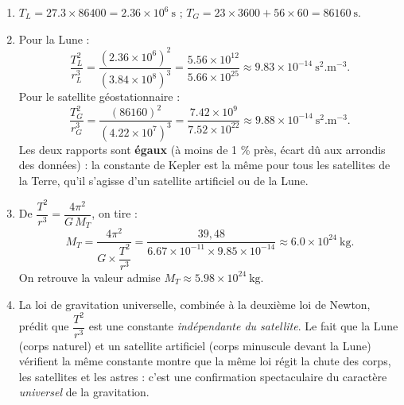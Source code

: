 \documentclass[11pt]{article}
\begin{document}
\begin{corrige}
\begin{enumerate}
\item $T_L = \num{27,3} \times \num{86400} = \num{2,36}\times 10^{6}\ \mathrm{s}$ ; \quad $T_G = 23\times 3600 + 56\times 60 = \num{86160}\ \mathrm{s}$.
\item Pour la Lune :
\[ \dfrac{T_L^2}{r_L^3} = \dfrac{(\num{2,36}\times 10^{6})^2}{(\num{3,84}\times 10^{8})^3} = \dfrac{\num{5,56}\times 10^{12}}{\num{5,66}\times 10^{25}} \approx \num{9,83}\times 10^{-14}\ \mathrm{s^2.m^{-3}}. \]
Pour le satellite géostationnaire :
\[ \dfrac{T_G^2}{r_G^3} = \dfrac{(\num{86160})^2}{(\num{4,22}\times 10^{7})^3} = \dfrac{\num{7,42}\times 10^{9}}{\num{7,52}\times 10^{22}} \approx \num{9,88}\times 10^{-14}\ \mathrm{s^2.m^{-3}}. \]
Les deux rapports sont \textbf{égaux} (à moins de 1 \% près, écart dû aux arrondis des données) : la constante de Kepler est la même pour tous les satellites de la Terre, qu'il s'agisse d'un satellite artificiel ou de la Lune.
\item De $\dfrac{T^2}{r^3} = \dfrac{4\pi^2}{G\,M_T}$, on tire :
\[ M_T = \dfrac{4\pi^2}{G \times \dfrac{T^2}{r^3}} = \dfrac{39,48}{\num{6,67}\times 10^{-11} \times \num{9,85}\times 10^{-14}} \approx \num{6,0}\times 10^{24}\ \mathrm{kg}. \]
On retrouve la valeur admise $M_T \approx \num{5,98}\times 10^{24}\ \mathrm{kg}$.
\item La loi de gravitation universelle, combinée à la deuxième loi de Newton, prédit que $\dfrac{T^2}{r^3}$ est une constante \emph{indépendante du satellite}. Le fait que la Lune (corps naturel) et un satellite artificiel (corps minuscule devant la Lune) vérifient la même constante montre que la même loi régit la chute des corps, les satellites et les astres : c'est une confirmation spectaculaire du caractère \emph{universel} de la gravitation.
\end{enumerate}
\end{corrige}
\end{document}
